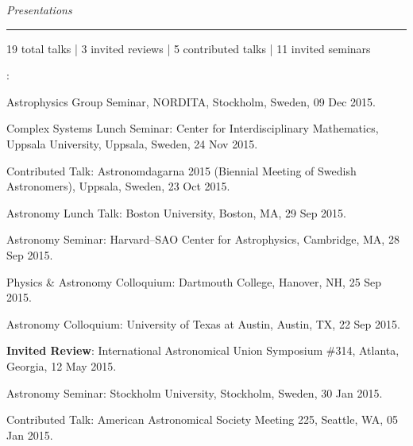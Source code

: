 \documentclass[12pt, a4paper]{article}
\begin{document}
{\Huge \noindent\textsc{} \hspace{\fill} {\Large\it Presentations}} \\
\hrule\vspace{\baselineskip}
\onehalfspacing


\begin{center}
19 total talks | 3 invited reviews | 5 contributed talks | 11 invited seminars %
\end{center}

\vspace{0.45\baselineskip}
: 

\begin{etaremune}[leftmargin=0.30in]
	\item Astrophysics Group Seminar, NORDITA, Stockholm, Sweden, 09 Dec 2015.
	
	\item Complex Systems Lunch Seminar: Center for Interdisciplinary Mathematics, Uppsala University, Uppsala, Sweden, 24 Nov 2015.
	
	\item Contributed Talk: Astronomdagarna 2015 (Biennial Meeting of Swedish Astronomers), Uppsala, Sweden, 23 Oct 2015.

	\item Astronomy Lunch Talk: Boston University, Boston, MA, 29 Sep 2015.

	\item Astronomy Seminar: Harvard--SAO Center for Astrophysics, Cambridge, MA, 28 Sep 2015.
	 
	\item Physics \& Astronomy Colloquium: Dartmouth College, Hanover, NH, 25 Sep 2015.

	\item Astronomy Colloquium: University of Texas at Austin, Austin, TX, 22 Sep 2015.

	\item {\bf Invited Review}: International Astronomical Union Symposium \#314, Atlanta, Georgia, 12 May 2015.
	 
	\item Astronomy Seminar: Stockholm University, Stockholm, Sweden, 30 Jan 2015.
	 
	\item Contributed Talk: American Astronomical Society Meeting 225, Seattle, WA, 05 Jan 2015.
	 

\end{etaremune}
\end{document}
